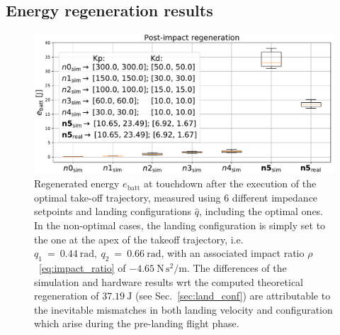 \subsection{Energy regeneration results}
\begin{figure}[t]
    \centering
    \includegraphics[width=1\columnwidth]{images/opt_vs_non_opt_conf.pdf}
    \caption{Regenerated energy $e_{\mathrm{batt}}$ at touchdown after the execution of the optimal take-off trajectory, measured using 6 different impedance setpoints and landing configurations $\hat{q}$, including the optimal ones. In the non-optimal cases, the landing configuration is simply set to the one at the apex of the takeoff trajectory, i.e. $q_1~=~0.44~\mathrm{rad},~q_2~=~0.66~\mathrm{rad}$, with an associated impact ratio $\rho$~\eqref{eq:impact_ratio} of $-4.65~\mathrm{N\,s^2/m}$. 
   	The differences of the simulation and hardware results wrt the computed theoretical regeneration of $37.19~\mathrm{J}$ (see Sec.~\ref{sec:land_conf}) are attributable to the inevitable mismatches in both landing velocity and configuration which arise during the pre-landing flight phase.}
    \label{fig:energy_rec_comp}
\end{figure}
